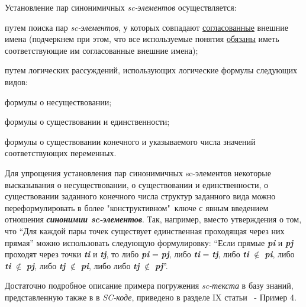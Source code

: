 \begin{SCn}
{Установление пар синонимичных \textit{sc-элементов} осуществляется:
\begin{scnitemize}
    \item путем поиска пар \textit{sc-элементов}, у которых совпадают \underline{согласованные} внешние имена (подчеркнем при этом, что все используемые понятия \underline{обязаны} иметь соответствующие им согласованные внешние имена);
    \item путем логических рассуждений, использующих логические формулы следующих видов:
     \begin{scnitemizeii}
        \item формулы о несуществовании;
        \item формулы о существовании и единственности;
        \item формулы о существовании конечного и указываемого числа значений соответствующих переменных.
    \end{scnitemizeii}
\end{scnitemize}

Для упрощения установления пар синонимичных sc-элементов некоторые высказывания о несуществовании, о существовании и единственности, о существовании заданного конечного числа структур заданного вида можно переформулировать в более "конструктивном"\ ключе с явным введением отношения \textit{\textbf{синонимии sc-элементов}}. Так, например, вместо утверждения о том, что ``Для каждой пары точек существует единственная проходящая через них прямая'' можно использовать следующую формулировку: ``Если прямые \textit{\textbf{pi}} и \textit{\textbf{pj}} проходят через точки \textit{\textbf{ti}} и \textit{\textbf{tj}}, то либо \textit{\textbf{pi}} = \textit{\textbf{pj}}, либо \textit{\textbf{ti}} = \textit{\textbf{tj}}, либо \textit{\textbf{ti}} $\notin$ \textit{\textbf{pi}}, либо \textit{\textbf{ti}} $\notin$ \textit{\textbf{pj}}, либо \textit{\textbf{tj}} $\notin$ \textit{\textbf{pi}}, либо либо \textit{\textbf{tj}} $\notin$ \textit{\textbf{pj}}''. 

Достаточно подробное описание примера погружения \textit{sc-текста} в базу знаний, представленную также в в \textit{SC-коде}, приведено в разделе IX статьи~\cite{Golenkov2018} - Пример 4.

}
\end{SCn}
